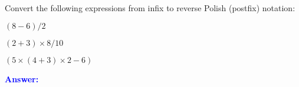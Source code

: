 \item{}
Convert the following expressions from infix to reverse Polish (postfix)
notation:
\begin{list}{\textbf{)}}{}
    \item $(8-6)/2$
    \item $(2+3)\times8/10$
    \item $(5\times(4+3)\times2-6)$
\end{list}
\vskip12pt
\ifanswers
\textcolor{blue}{
\textbf{Answer:}\\
}
\newpage
\fi
